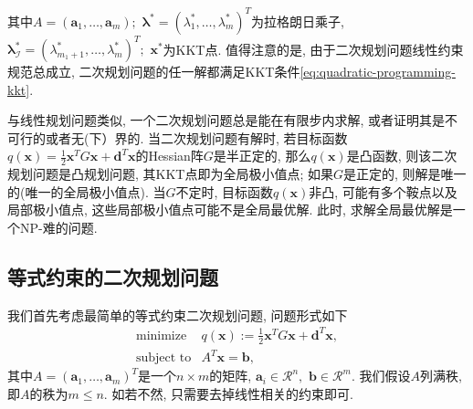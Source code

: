 \documentclass{SBCbookchapter}
\newcommand{\V}[1]{{\bm{#1}}}
\newcommand{\R}{\mathcal{R}}
\numberwithin{equation}{section}
\begin{document}
其中$A = (\V{a}_1, \ldots, \V{a}_m);$ $\V{\lambda}^* = (\lambda_1^*, \ldots, \lambda_m^*)^T$为拉格朗日乘子, $\V{\lambda}^*_{\mathcal{I}} = (\lambda_{m_1+1}^*, \ldots, \lambda_m^*)^T;$ $\V{x}^*$为KKT点. 值得注意的是, 由于二次规划问题线性约束规范总成立, 二次规划问题的任一解都满足KKT条件\eqref{eq:quadratic-programming-kkt}.

与线性规划问题类似, 一个二次规划问题总是能在有限步内求解, 或者证明其是不可行的或者无(下）界的. 当二次规划问题有解时, 若目标函数$q(\V{x}) = \frac{1}{2} \V{x}^T G \V{x} + \V{d}^T \V{x}$的Hessian阵$G$是半正定的, 那么$q(\V{x})$是凸函数, 则该二次规划问题是凸规划问题, 其KKT点即为全局极小值点; 如果$G$是正定的, 则解是唯一的(唯一的全局极小值点). 当$G$不定时, 目标函数$q(\V{x})$非凸, 可能有多个鞍点以及局部极小值点, 这些局部极小值点可能不是全局最优解. 此时, 求解全局最优解是一个NP-难的问题\cite{Murty_1987}.


\subsection{等式约束的二次规划问题}
\label{subsec:7.2.1}

我们首先考虑最简单的等式约束二次规划问题, 问题形式如下
\begin{equation}
\label{eq:quadratic-programming-eq-constrained}
\begin{array}{cl}
\text{minimize} & q(\V{x}) := \frac{1}{2} \V{x}^T G \V{x} + \V{d}^T \V{x}, \\
\text{subject to} & A^T \V{x} = \V{b},
\end{array}
\end{equation}
其中$A = (\V{a}_1, \ldots, \V{a}_m)^T$是一个$n \times m$的矩阵, $\V{a}_i \in \R^n,$ $\V{b} \in \R^m.$ 我们假设$A$列满秩, 即$A$的秩为$m \leqslant n.$ 如若不然, 只需要去掉线性相关的约束即可.
\end{document}
